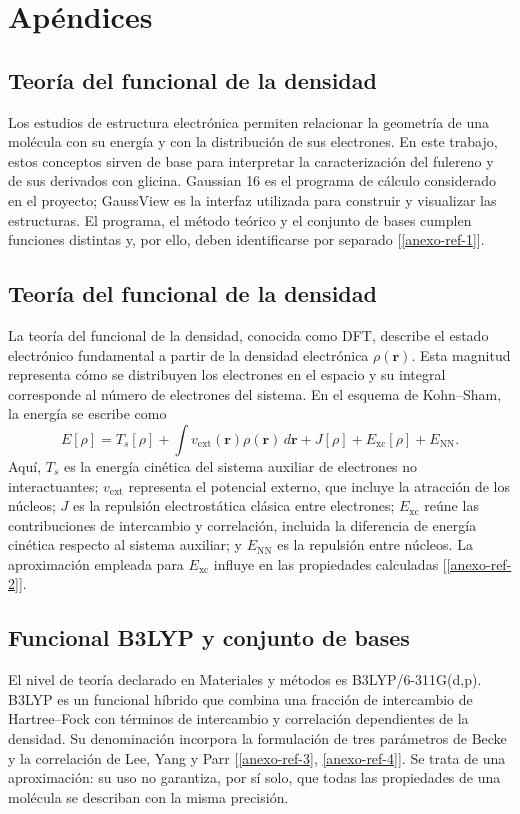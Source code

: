 
\chapter{Apéndices}
\label{ap:fundamentos-gaussian}
\section{Teoría del funcional de la densidad}
Los estudios de estructura electrónica permiten relacionar la geometría de una molécula con su energía y con la distribución de sus electrones. En este trabajo, estos conceptos sirven de base para interpretar la caracterización del fulereno y de sus derivados con glicina. Gaussian 16 es el programa de cálculo considerado en el proyecto; GaussView es la interfaz utilizada para construir y visualizar las estructuras. El programa, el método teórico y el conjunto de bases cumplen funciones distintas y, por ello, deben identificarse por separado [\ref{anexo-ref-1}].

\section{Teoría del funcional de la densidad}
La teoría del funcional de la densidad, conocida como DFT, describe el estado electrónico fundamental a partir de la densidad electrónica $\rho(\mathbf r)$. Esta magnitud representa cómo se distribuyen los electrones en el espacio y su integral corresponde al número de electrones del sistema. En el esquema de Kohn--Sham, la energía se escribe como
\begin{equation}
 E[\rho]=T_s[\rho]+\int v_{\mathrm{ext}}(\mathbf r)\rho(\mathbf r)\,d\mathbf r
 +J[\rho]+E_{\mathrm{xc}}[\rho]+E_{\mathrm{NN}}.
\end{equation}
Aquí, $T_s$ es la energía cinética del sistema auxiliar de electrones no interactuantes; $v_{\mathrm{ext}}$ representa el potencial externo, que incluye la atracción de los núcleos; $J$ es la repulsión electrostática clásica entre electrones; $E_{\mathrm{xc}}$ reúne las contribuciones de intercambio y correlación, incluida la diferencia de energía cinética respecto al sistema auxiliar; y $E_{\mathrm{NN}}$ es la repulsión entre núcleos. La aproximación empleada para $E_{\mathrm{xc}}$ influye en las propiedades calculadas [\ref{anexo-ref-2}].

\section{Funcional B3LYP y conjunto de bases}
El nivel de teoría declarado en Materiales y métodos es B3LYP/6-311G(d,p). B3LYP es un funcional híbrido que combina una fracción de intercambio de Hartree--Fock con términos de intercambio y correlación dependientes de la densidad. Su denominación incorpora la formulación de tres parámetros de Becke y la correlación de Lee, Yang y Parr [\ref{anexo-ref-3}, \ref{anexo-ref-4}]. Se trata de una aproximación: su uso no garantiza, por sí solo, que todas las propiedades de una molécula se describan con la misma precisión.

